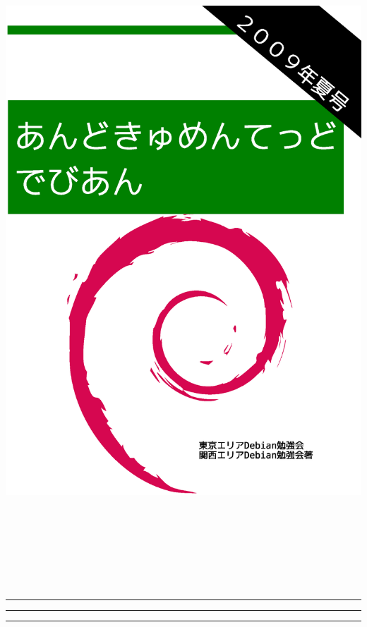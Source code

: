 \documentclass[mingoth,a4paper]{jsarticle}
\begin{document}
\begin{titlepage}
\includegraphics[height=252mm]{image2009-natsu/2009-summer.eps}
\end{titlepage}

\newpage
\begin{minipage}[]{0.2\hsize}
 \colorbox{dancerlightblue}{}
\end{minipage}
\begin{minipage}[]{0.8\hsize}
\hrule
\vspace{1mm}
\hrule
\setcounter{tocdepth}{1}
{\small
 \tableofcontents}
\vspace{1mm}
\hrule
\vspace{3cm}

\end{minipage}
\end{document}
